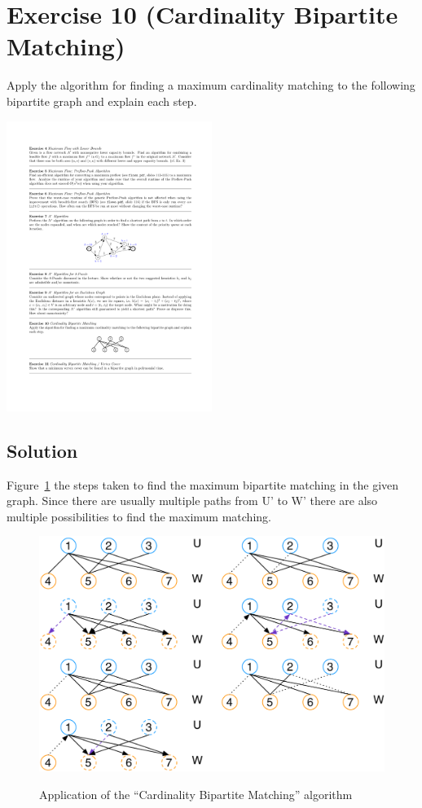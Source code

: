 \documentclass[a4paper, 12pt]{report}
\begin{document}
\section{Exercise 10 (Cardinality Bipartite Matching)}
\label{section:Exercise_2_10}

Apply the algorithm for finding a maximum cardinality matching to the following
bipartite graph and explain each step.

\begin{center}
    \includegraphics[width=0.5\textwidth]{Figures/Exercise_2_10}
\end{center}

\subsection{Solution}

Figure~\ref{figure:Exercise_2_10_Maximum_Matching} the steps taken to find the
maximum bipartite matching in the given graph. Since there are usually multiple
paths from U' to W' there are also multiple possibilities to find the maximum
matching.

\begin{figure}[htbp]
    \caption{Application of the “Cardinality Bipartite Matching” algorithm}
    \vskip 0.2cm
    \centering
    \includegraphics[width=\textwidth]{Figures/Exercise_2_10_Maximum_Matching}
    \label{figure:Exercise_2_10_Maximum_Matching}
\end{figure}
\end{document}
